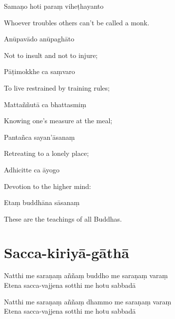 Samaṇo hoti paraṃ viheṭhayanto

\begin{cprenglish}
  Whoever troubles others can't be called a monk.
\end{cprenglish}

Anūpavādo anūpaghāto

\begin{cprenglish}
  Not to insult and not to injure;
\end{cprenglish}

Pāṭimokkhe ca saṃvaro

\begin{cprenglish}
  To live restrained by training rules;
\end{cprenglish}

Mattaññutā ca bhattasmiṃ

\begin{cprenglish}
  Knowing one's measure at the meal;
\end{cprenglish}

Pantañca sayan'āsanaṃ

\begin{cprenglish}
  Retreating to a lonely place;
\end{cprenglish}

Adhicitte ca āyogo

\begin{cprenglish}
  Devotion to the higher mind:
\end{cprenglish}

Etaṃ buddhāna sāsanaṃ

\begin{cprenglish}
  These are the teachings of all Buddhas. 
\end{cprenglish}

\section{Sacca-kiriyā-gāthā}

\begin{leader}
\end{leader}


Natthi me saraṇaṃ aññaṃ buddho me saraṇaṃ varaṃ\\
Etena sacca-vajjena sotthi me hotu sabbadā

Natthi me saraṇaṃ aññaṃ dhammo me saraṇaṃ varaṃ\\
Etena sacca-vajjena sotthi me hotu sabbadā

